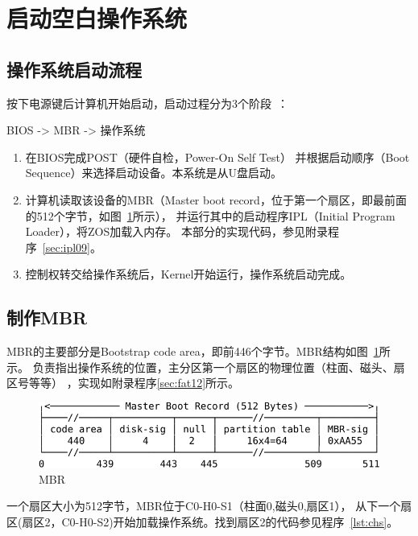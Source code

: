 \section{启动空白操作系统}

\subsection{操作系统启动流程}

按下电源键后计算机开始启动，启动过程分为3个阶段~\cite{阮一峰2014如何变得有思想}：
\begin{center}BIOS -> MBR -> 操作系统\end{center}

\begin{enumerate}
\item 在BIOS完成POST（硬件自检，Power-On Self Test）
  并根据启动顺序（Boot Sequence）来选择启动设备。本系统是从U盘启动。
\item 计算机读取该设备的MBR（Master boot record，位于第一个扇区，即最前面的512个字节，如图~\ref{fig:mbr}所示），
  并运行其中的启动程序IPL（Initial Program Loader），将ZOS加载入内存。
  本部分的实现代码，参见附录程序~\ref{sec:ipl09}。
\item 控制权转交给操作系统后，Kernel开始运行，操作系统启动完成。
\end{enumerate}

\subsection{制作MBR}

MBR的主要部分是Bootstrap code area，即前446个字节。MBR结构如图~\ref{fig:mbr}所示。
负责指出操作系统的位置，主分区第一个扇区的物理位置（柱面、磁头、扇区号等等）
，实现如附录程序\ref{sec:fat12}所示。

\begin{figure}[H]
  \centering
  \includegraphics[width=1\textwidth]{../Fig/mbr.pdf}
  \caption{MBR}
  \label{fig:mbr}
\end{figure}

一个扇区大小为512字节，MBR位于C0-H0-S1（柱面0,磁头0,扇区1），\cite{刘伟2010数据恢复技术深度揭秘}
从下一个扇区(扇区2，C0-H0-S2)开始加载操作系统。找到扇区2的代码参见程序~\ref{lst:chs}。

